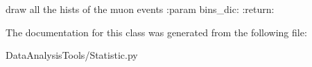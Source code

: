 \begin{DoxyVerb}draw all the hists of the muon events
:param bins_dic:
:return:
\end{DoxyVerb}
 

The documentation for this class was generated from the following file\+:\begin{DoxyCompactItemize}
\item 
Data\+Analysis\+Tools/Statistic.\+py\end{DoxyCompactItemize}
